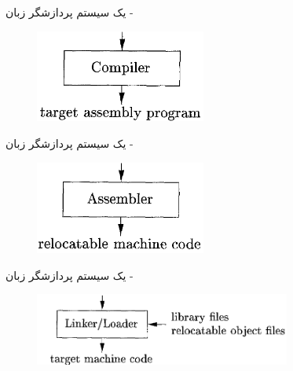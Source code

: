 \begin{frame}{یک سیستم پردازشگر زبان - }
\begin{figure}[H]
\begin{center}
\includegraphics[width=0.5\textwidth, height=0.5\textheight, angle=0.6]{docs/images/compiler}
\end{center}
\end{figure}
\end{frame}

\begin{frame}{یک سیستم پردازشگر زبان - }
\begin{figure}[H]
\begin{center}
\includegraphics[width=0.5\textwidth, height=0.5\textheight, angle=0.6]{docs/images/assembler}
\end{center}
\end{figure}
\end{frame}

\begin{frame}{یک سیستم پردازشگر زبان - }
\begin{figure}[H]
\begin{center}
\includegraphics[width=0.75\textwidth, height=0.5\textheight, angle=0.4]{docs/images/linkerloader}
\end{center}
\end{figure}
\end{frame}